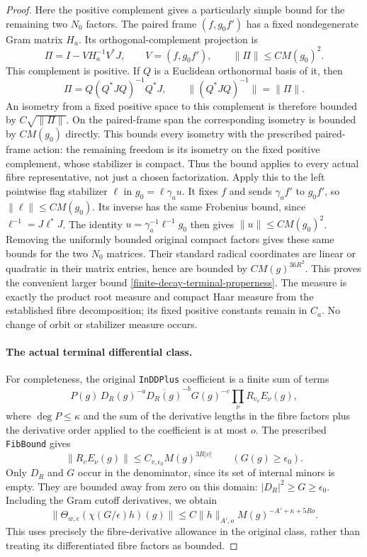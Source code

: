 \begin{proof}
Here the positive complement gives a particularly simple bound
for the remaining two $N_0$ factors.  The paired frame
$(f,g_0f')$ has a fixed nondegenerate Gram matrix $H_a$.
Its orthogonal-complement projection is
\[
        \Pi=I-VH_a^{-1}V^*J,\qquad V=(f,g_0f'),
                         \qquad \|\Pi\|\le C M(g_0)^2.
\]
This complement is positive.  If $Q$ is a Euclidean orthonormal
basis of it, then
\[
 \Pi=Q(Q^*JQ)^{-1}Q^*J,\qquad
        \|(Q^*JQ)^{-1}\|=\|\Pi\|.
\]
An isometry from a fixed positive space to this complement is
therefore bounded by $C\sqrt{\|\Pi\|}$.  On the paired-frame
span the corresponding isometry is bounded by $CM(g_0)$ directly.
This bounds every isometry with the prescribed paired-frame action:
the remaining freedom is its isometry on the fixed positive
complement, whose stabilizer is compact.  Thus the bound applies
to every actual fibre representative, not just a chosen factorization.
Apply this to the left pointwise flag stabilizer $\ell$ in
$g_0=\ell\gamma_a u$.  It fixes $f$ and sends $\gamma_af'$
to $g_0f'$, so $\|\ell\|\le CM(g_0)$.  Its inverse has the
same Frobenius bound, since $\ell^{-1}=J\ell^*J$.  The identity
$u=\gamma_a^{-1}\ell^{-1}g_0$ then gives
$\|u\|\le CM(g_0)^2$.  Removing the uniformly bounded original
compact factors gives these same bounds for the two $N_0$
matrices.  Their standard radical coordinates are linear or
quadratic in their matrix entries, hence are bounded by
$CM(g)^{36R^2}$.  This proves the convenient larger bound
\eqref{finite-decay-terminal-properness}.  The measure is exactly
the product root measure and compact Haar measure from the
established fibre decomposition; its fixed positive constants
remain in $C_a$.  No change of orbit or stabilizer measure occurs.

\paragraph{The actual terminal differential class.}
For completeness, the original \texttt{InDDPlus} coefficient is
a finite sum of terms
\[
       P(g)\,D_R(g)^{-a}\overline{D_R(g)}^{-b}G(g)^{-c}
                    \prod_\nu R_{v_\nu}E_\nu(g),
\]
where $\deg P\le\kappa$ and the sum of the derivative lengths
in the fibre factors plus the derivative order applied to the
coefficient is at most $o$.  The prescribed \texttt{FibBound}
gives
\[
        \|R_vE_\nu(g)\|\le C_{v,\epsilon_0}M(g)^{3R|v|}
                         \qquad(G(g)\ge\epsilon_0).
\]
Only $D_R$ and $G$ occur in the denominator, since its set of
internal minors is empty.  They are bounded away from zero on
this domain: $|D_R|^2\ge G\ge\epsilon_0$.  Including the Gram
cutoff derivatives, we obtain
\begin{equation}\label{finite-decay-top-pointwise}
 \|\Theta_{w,e}(\chi(G/\epsilon)h)(g)\|
       \le C\|h\|_{A',o}M(g)^{-A'+\kappa+5Ro}.
\end{equation}
This uses precisely the fibre-derivative allowance in the original
class, rather than treating its differentiated fibre factors as
bounded.


\end{proof}
